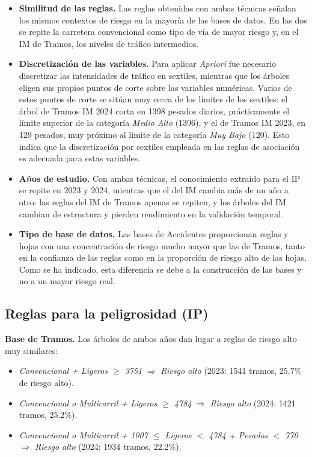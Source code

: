 \documentclass[twoside,a4paper,12pt,onecolumn,openany]{book}
\begin{document}
\begin{itemize}
    \item \textbf{Similitud de las reglas.} Las reglas obtenidas con ambas técnicas señalan los mismos contextos de riesgo en la mayoría de las bases de datos. En las dos se repite la carretera convencional como tipo de vía de mayor riesgo y, en el IM de Tramos, los niveles de tráfico intermedios.
 
    \item \textbf{Discretización de las variables.} Para aplicar \textit{Apriori} fue necesario discretizar las intensidades de tráfico en sextiles, mientras que los árboles eligen sus propios puntos de corte sobre las variables numéricas. Varios de estos puntos de corte se sitúan muy cerca de los límites de los sextiles: el árbol de Tramos IM 2024 corta en 1398 pesados diarios, prácticamente el límite superior de la categoría \textit{Medio Alto} (1396), y el de Tramos IM 2023, en 129 pesados, muy próximo al límite de la categoría \textit{Muy Bajo} (120). Esto indica que la discretización por sextiles empleada en las reglas de asociación es adecuada para estas variables.
 
    \item \textbf{Años de estudio.} Con ambas técnicas, el conocimiento extraído para el IP se repite en 2023 y 2024, mientras que el del IM cambia más de un año a otro: las reglas del IM de Tramos apenas se repiten, y los árboles del IM cambian de estructura y pierden rendimiento en la validación temporal.
 
    \item \textbf{Tipo de base de datos.} Las bases de Accidentes proporcionan reglas y hojas con una concentración de riesgo mucho mayor que las de Tramos, tanto en la confianza de las reglas como en la proporción de riesgo alto de las hojas. Como se ha indicado, esta diferencia se debe a la construcción de las bases y no a un mayor riesgo real.
\end{itemize}
 
\subsection{Reglas para la peligrosidad (IP)}
 
\textbf{Base de Tramos.} Los árboles de ambos años dan lugar a reglas de riesgo alto muy similares:
 
\begin{itemize}
    \item \textit{Convencional + Ligeros $\geq$ 3751} $\Rightarrow$ \textit{Riesgo alto} (2023: 1541 tramos, $25.7\%$ de riesgo alto).
    \item \textit{Convencional o Multicarril + Ligeros $\geq$ 4784} $\Rightarrow$ \textit{Riesgo alto} (2024: 1421 tramos, $25.2\%$).
    \item \textit{Convencional o Multicarril + 1007 $\leq$ Ligeros $<$ 4784 + Pesados $<$ 770} $\Rightarrow$ \textit{Riesgo alto} (2024: 1934 tramos, $22.2\%$).
\end{itemize}
 
\end{document}
